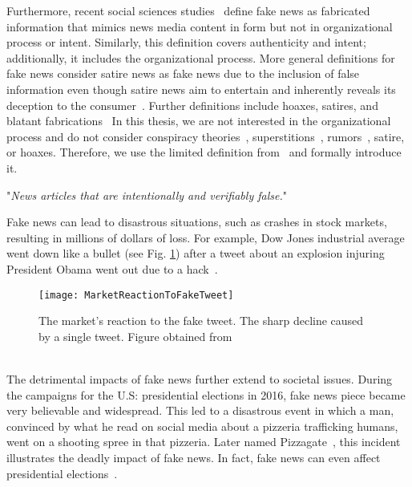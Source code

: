 Furthermore, recent social sciences studies~\parencite{TheScienceOfFakeNews_Lazer, ThePsycologyOfFakeNews_Pennycook} define fake news as fabricated information that mimics news media content in form but not in organizational process or intent. Similarly, this definition covers authenticity and intent; additionally, it includes the organizational process. More general definitions for fake news consider satire news as fake news due to the inclusion of false information even though satire news aim to entertain and inherently reveals its deception to the consumer~\parencite{WhenFakeNewsBecomesReal_Balmas, TheImpactOfRealNewsAboutFakeNews_Brewer, NewsVerificationByExploitingConflictingSocialViewpoints_Jin, FakeNewsOrTruthUsingSatiricalCues_Rubin}. Further definitions include hoaxes, satires, and blatant
fabrications~\parencite{DeceptionDetectionForFakeNews3TypesOfFakeNews_Rubin}
In this thesis, we are not interested in the organizational process and do not consider conspiracy theories~\parencite{ConspiracyTheories_Sunstein}, superstitions~\parencite{Superstition_Lindeman}, rumors~\parencite{RumorsAndHealthCareReform_Berinsky}, satire, or hoaxes. Therefore, we use the limited definition from~\parencite{SocialMediaAndFakeNewsIn2016Election_Allcott} and formally introduce it.
\begin{definition}
    "\emph{News articles that are intentionally and verifiably false.}"~\parencite{SocialMediaAndFakeNewsIn2016Election_Allcott}
\end{definition}
Fake news can lead to disastrous situations, such as crashes in stock markets, resulting in millions of dollars of loss. For example, Dow Jones industrial average went down like a bullet (see Fig. \ref{fig:MarketReactionToFakeTweet}) after a tweet about an explosion injuring President Obama went out due to a hack~\parencite{MarketQuaversAfterFakeAPTweet_ElBoghdady}.
\begin{figure}
    \centering
    \texttt{[image: MarketReactionToFakeTweet]}
    \caption[Market Reaction to Fake Tweet]{The market's reaction to the fake tweet. The sharp decline caused by a single tweet. Figure obtained from~\parencite{MarketQuaversAfterFakeAPTweet_ElBoghdady}}\label{fig:MarketReactionToFakeTweet}
\end{figure}\\
The detrimental impacts of fake news further extend to societal issues. During the campaigns for the U.S: presidential elections in 2016, fake news piece became very believable and widespread. This led to a disastrous event in which a man, convinced by what he read on social media about a pizzeria trafficking humans, went on a shooting spree in that pizzeria. Later named Pizzagate~\parencite{Pizzagate_Fisher}, this incident illustrates the deadly impact of fake news. In fact, fake news can even affect presidential elections~\parencite{SocialMediaAndFakeNewsIn2016Election_Allcott, TrumpWonBecauseOfFacebook_Read}.\\
